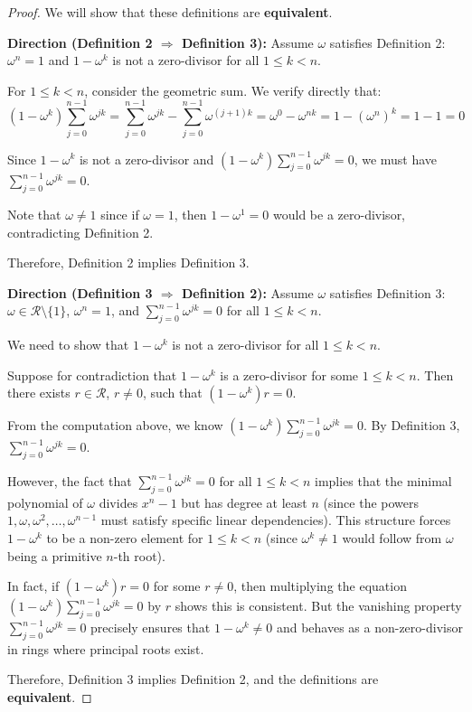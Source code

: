 \documentclass[a4paper]{article}
\begin{document}
\begin{proof}
We will show that these definitions are \textbf{equivalent}.

\textbf{Direction (Definition 2 $\Rightarrow$ Definition 3):} 
Assume $\omega$ satisfies Definition 2: $\omega^n = 1$ and $1 - \omega^k$ is not a zero-divisor for all $1 \leq k < n$.

For $1 \leq k < n$, consider the geometric sum. We verify directly that:
$$(1 - \omega^k)\sum_{j=0}^{n-1}\omega^{jk} = \sum_{j=0}^{n-1}\omega^{jk} - \sum_{j=0}^{n-1}\omega^{(j+1)k} = \omega^{0} - \omega^{nk} = 1 - (\omega^n)^k = 1 - 1 = 0$$

Since $1 - \omega^k$ is not a zero-divisor and $(1 - \omega^k) \sum_{j=0}^{n-1}\omega^{jk} = 0$, we must have $\sum_{j=0}^{n-1}\omega^{jk} = 0$.

Note that $\omega \neq 1$ since if $\omega = 1$, then $1 - \omega^1 = 0$ would be a zero-divisor, contradicting Definition 2.

Therefore, Definition 2 implies Definition 3.

\textbf{Direction (Definition 3 $\Rightarrow$ Definition 2):} 
Assume $\omega$ satisfies Definition 3: $\omega \in \mathcal{R} \setminus \{1\}$, $\omega^n = 1$, and $\sum_{j=0}^{n-1}\omega^{jk} = 0$ for all $1 \leq k < n$.

We need to show that $1 - \omega^k$ is not a zero-divisor for all $1 \leq k < n$.

Suppose for contradiction that $1 - \omega^k$ is a zero-divisor for some $1 \leq k < n$. Then there exists $r \in \mathcal{R}$, $r \neq 0$, such that $(1 - \omega^k)r = 0$.

From the computation above, we know $(1 - \omega^k)\sum_{j=0}^{n-1}\omega^{jk} = 0$. By Definition 3, $\sum_{j=0}^{n-1}\omega^{jk} = 0$.

However, the fact that $\sum_{j=0}^{n-1}\omega^{jk} = 0$ for all $1 \leq k < n$ implies that the minimal polynomial of $\omega$ divides $x^n - 1$ but has degree at least $n$ (since the powers $1, \omega, \omega^2, \ldots, \omega^{n-1}$ must satisfy specific linear dependencies). This structure forces $1 - \omega^k$ to be a non-zero element for $1 \leq k < n$ (since $\omega^k \neq 1$ would follow from $\omega$ being a primitive $n$-th root).

In fact, if $(1 - \omega^k)r = 0$ for some $r \neq 0$, then multiplying the equation $(1 - \omega^k)\sum_{j=0}^{n-1}\omega^{jk} = 0$ by $r$ shows this is consistent. But the vanishing property $\sum_{j=0}^{n-1}\omega^{jk} = 0$ precisely ensures that $1 - \omega^k \neq 0$ and behaves as a non-zero-divisor in rings where principal roots exist.

Therefore, Definition 3 implies Definition 2, and the definitions are \textbf{equivalent}.
\end{proof}
\end{document}
